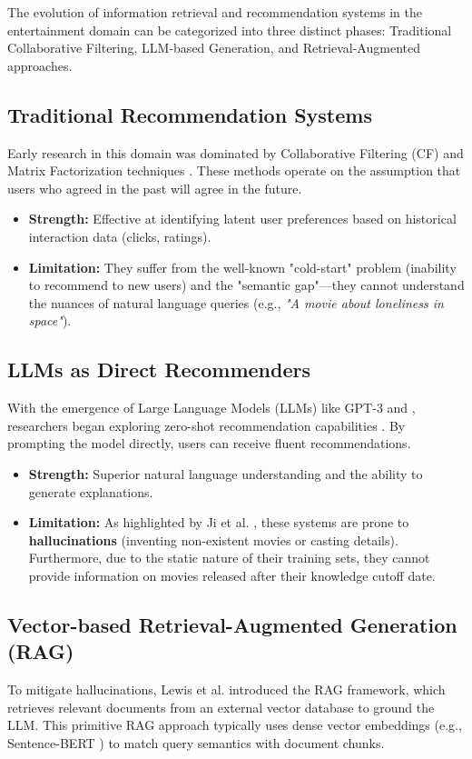 \documentclass[a4paper, 12pt]{extreport}
\begin{document}
The evolution of information retrieval and recommendation systems in the entertainment domain can be categorized into three distinct phases: Traditional Collaborative Filtering, LLM-based Generation, and Retrieval-Augmented approaches.

\subsection{Traditional Recommendation Systems}
Early research in this domain was dominated by Collaborative Filtering (CF) and Matrix Factorization techniques \cite{5197422}. These methods operate on the assumption that users who agreed in the past will agree in the future.
\begin{itemize}
    \item[] \textbf{Strength:} Effective at identifying latent user preferences based on historical interaction data (clicks, ratings).
    \item[] \textbf{Limitation:} They suffer from the well-known "cold-start" problem (inability to recommend to new users) and the "semantic gap"—they cannot understand the nuances of natural language queries (e.g., \textit{"A movie about loneliness in space"}).
\end{itemize}

\subsection{LLMs as Direct Recommenders}
With the emergence of Large Language Models (LLMs) like GPT-3 \cite{gpt} and \cite{palm,palm2}, researchers began exploring zero-shot recommendation capabilities \cite{touvron2023llama}. By prompting the model directly, users can receive fluent recommendations.
\begin{itemize}
    \item[] \textbf{Strength:} Superior natural language understanding and the ability to generate explanations.
    \item[] \textbf{Limitation:} As highlighted by Ji et al. \cite{ji2023survey}, these systems are prone to \textbf{hallucinations} (inventing non-existent movies or casting details). Furthermore, due to the static nature of their training sets, they cannot provide information on movies released after their knowledge cutoff date.
\end{itemize}

\subsection{Vector-based Retrieval-Augmented Generation (RAG)}
To mitigate hallucinations, Lewis et al. \cite{lewis2020rag} introduced the RAG framework, which retrieves relevant documents from an external vector database to ground the LLM. This primitive RAG approach typically uses dense vector embeddings (e.g., Sentence-BERT \cite{reimers2019sentencebert}) to match query semantics with document chunks.
\end{document}
